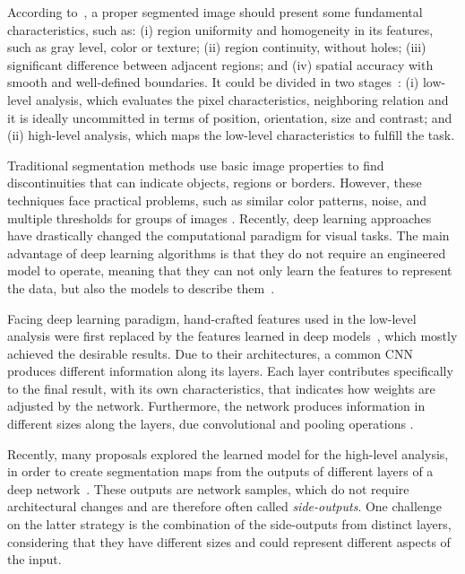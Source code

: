 According to~\cite{Dominguez:2016}, a proper segmented image should present some fundamental characteristics, such as: (i) region uniformity and homogeneity in  its features, such as gray level, color or texture; (ii) region continuity, without holes; (iii) significant difference between adjacent regions; and (iv) spatial accuracy with smooth and well-defined boundaries.
It could be divided in two stages~\cite{Guigues:2006}: (i) low-level analysis, which evaluates the pixel characteristics, neighboring relation and it is ideally uncommitted in terms of position, orientation, size and contrast; and (ii) high-level analysis, which maps the low-level characteristics to fulfill the task.

Traditional segmentation methods use basic image properties to find discontinuities that can indicate objects, regions or borders.
However, these techniques face practical problems, such as similar color patterns, noise, and multiple thresholds for groups of images \cite{MARTIN:1273918} \cite{Segnet:2017:7803544}.
Recently, deep learning approaches have drastically changed the computational paradigm for visual tasks. The main advantage of deep learning algorithms is that they do not require an engineered model to operate, meaning that they can not only learn the features to represent the data, but also the models to describe them~\cite{Goodfellow:2016}.

Facing deep learning paradigm, hand-crafted features used in the low-level analysis were first replaced by the features learned in deep models~\cite{Farabet:2013, Lee:2015, VGGNET:2014}, which mostly achieved the desirable results.
Due to their architectures, a common CNN produces different information along its layers.
Each layer contributes specifically to the final result, with its own characteristics, that indicates how weights are adjusted by the network.
Furthermore, the network produces information in different sizes along the layers, due convolutional and pooling operations \cite{VGGNET:2014, Zeiler:2014, Fidler:2007, Hadji:2018}. %

Recently, many proposals explored the learned model for the high-level analysis, in order to create segmentation maps from the outputs of different layers of a deep network~\cite{Xie:2017:HED:3158436.3158453, Cheng:2016, COB:2016, RCF:2017:8100105, Yang:2018}.
These outputs are network samples, which do not require architectural changes and are therefore often called \textit{side-outputs}.
One challenge on the latter strategy is the combination of the side-outputs from distinct layers, considering that they have different sizes and could represent different aspects of the input.

